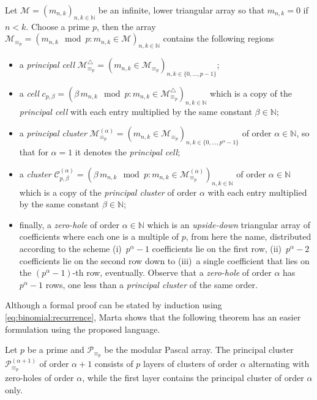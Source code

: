 Let $\mathcal{M}=\left(m_{n,k}\right)_{n,k\in\mathbb{N}}$ be an infinite, lower
triangular array so that $m_{n,k}=0$ if $n<k$. Choose a prime $p$, then the
array $\displaystyle\mathcal{M}_{\equiv_{p}} = \left(m_{n,k}\mod p :
m_{n,k} \in \mathcal{M}\right)_{n,k\in\mathbb{N}}$ contains the following regions
\begin{itemize}

\item a \emph{principal cell} $\mathcal{M}_{\equiv_{p}}^{\bigtriangleup} = 
        \left(m_{n,k}\in \mathcal{M}_{\equiv_{p}}\right)_{n,k\in\lbrace 0,\ldots,p-1\rbrace}$;

\item a \emph{cell} $c_{p,\beta}=\left( \beta\,m_{n,k}\mod p:m_{n,k}\in
\mathcal{M}_{\equiv_{p}}^{\bigtriangleup}\right)_{n,k\in\mathbb{N}}$ which is a
copy of the \emph{principal cell} with each entry multiplied by the same
constant $\beta\in\mathbb{N}$;

\item a \emph{principal cluster} $\mathcal{M}_{\equiv_{p}}^{(\alpha)} =
\left(m_{n,k}\in \mathcal{M}_{\equiv_{p}}\right)_{n,k\in\lbrace
0,\ldots,p^{\alpha}-1\rbrace}$ of order $\alpha\in\mathbb{N}$, so that for
$\alpha=1$ it denotes the \emph{principal cell};

\item a \emph{cluster} $\mathcal{C}_{p,\beta}^{(\alpha)}=\left(
\beta\,m_{n,k}\mod p:m_{n,k}\in
\mathcal{M}_{\equiv_{p}}^{(\alpha)}\right)_{n,k\in\mathbb{N}}$ of order
$\alpha\in\mathbb{N}$ which is a copy of the \emph{principal cluster} of order
$\alpha$ with each entry multiplied by the same constant $\beta\in\mathbb{N}$;

\item finally, a \emph{zero-hole} of order $\alpha\in\mathbb{N}$ which is an
\emph{upside-down} triangular array of coefficients where each one is a
multiple of $p$, from here the name, distributed according to the scheme
(i)~$p^{\alpha}-1$ coefficients lie on the first row, (ii)~$p^{\alpha}-2$
coefficients lie on the second row down to (iii)~a single coefficient that lies
on the $(p^{\alpha}-1)$-th row, eventually.  Observe that a \emph{zero-hole} of
order $\alpha$ has $p^{\alpha}-1$ rows, one less than a \emph{principal
cluster} of the same order.

\end{itemize}


Although a formal proof can be stated by induction using
\autoref{eq:binomial:recurrence}, Marta shows that the following  theorem  has
an easier formulation using the proposed language.

\begin{theorem}[Sved]
    Let $p$ be a prime and $\mathcal{P}_{\equiv_{p}}$ be the 
    modular Pascal array. The principal cluster $\mathcal{P}_{\equiv_{p}}^{(\alpha+1)}$
    of order $\alpha + 1$ consists of $p$ layers of clusters of order $\alpha$ alternating
    with zero-holes of order $\alpha$, while the first layer contains the principal
    cluster of order $\alpha$ only.
\end{theorem}
